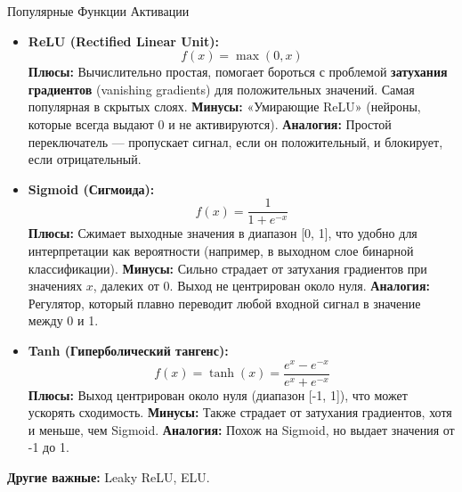 \begin{myexampleblock}{Популярные Функции Активации}
    \begin{itemize}
        \item \textbf{ReLU (Rectified Linear Unit):}
            \[ f(x) = \max(0, x) \]
            \textbf{Плюсы:} Вычислительно простая, помогает бороться с проблемой \textbf{затухания градиентов} (vanishing gradients) для положительных значений. Самая популярная в скрытых слоях.
            \textbf{Минусы:} «Умирающие ReLU» (нейроны, которые всегда выдают 0 и не активируются).
            \textbf{Аналогия:} Простой переключатель — пропускает сигнал, если он положительный, и блокирует, если отрицательный.

        \item \textbf{Sigmoid (Сигмоида):}
            \[ f(x) = \frac{1}{1 + e^{-x}} \]
            \textbf{Плюсы:} Сжимает выходные значения в диапазон [0, 1], что удобно для интерпретации как вероятности (например, в выходном слое бинарной классификации).
            \textbf{Минусы:} Сильно страдает от затухания градиентов при значениях $x$, далеких от 0. Выход не центрирован около нуля.
            \textbf{Аналогия:} Регулятор, который плавно переводит любой входной сигнал в значение между 0 и 1.

        \item \textbf{Tanh (Гиперболический тангенс):}
            \[ f(x) = \tanh(x) = \frac{e^x - e^{-x}}{e^x + e^{-x}} \]
            \textbf{Плюсы:} Выход центрирован около нуля (диапазон [-1, 1]), что может ускорять сходимость.
            \textbf{Минусы:} Также страдает от затухания градиентов, хотя и меньше, чем Sigmoid.
            \textbf{Аналогия:} Похож на Sigmoid, но выдает значения от -1 до 1.
    \end{itemize}
    \textbf{Другие важные:} Leaky ReLU, ELU.
\end{myexampleblock}

